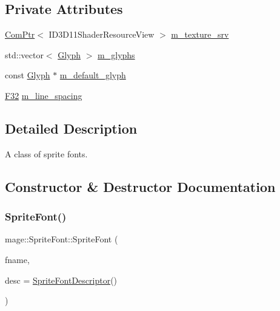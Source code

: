 \subsection*{Private Attributes}
\begin{DoxyCompactItemize}
\item 
\hyperlink{namespacemage_ae74f374780900893caa5555d1031fd79}{Com\+Ptr}$<$ I\+D3\+D11\+Shader\+Resource\+View $>$ \hyperlink{classmage_1_1_sprite_font_a0f52f8845cb204d4ca3b3f3020df0029}{m\+\_\+texture\+\_\+srv}
\item 
std\+::vector$<$ \hyperlink{structmage_1_1_glyph}{Glyph} $>$ \hyperlink{classmage_1_1_sprite_font_a8862df8d743ea33996c76e421724c0a7}{m\+\_\+glyphs}
\item 
const \hyperlink{structmage_1_1_glyph}{Glyph} $\ast$ \hyperlink{classmage_1_1_sprite_font_ad25667d3bfb539b71b39124fdc8ed6d6}{m\+\_\+default\+\_\+glyph}
\item 
\hyperlink{namespacemage_aa97e833b45f06d60a0a9c4fc22ae02c0}{F32} \hyperlink{classmage_1_1_sprite_font_a0d85446d7a3e2c1f73a013314fca4d84}{m\+\_\+line\+\_\+spacing}
\end{DoxyCompactItemize}


\subsection{Detailed Description}
A class of sprite fonts. 

\subsection{Constructor \& Destructor Documentation}
\hypertarget{classmage_1_1_sprite_font_a14069bfb14980107c74407182e591927}{}\label{classmage_1_1_sprite_font_a14069bfb14980107c74407182e591927} 
\subsubsection{\texorpdfstring{Sprite\+Font()}{SpriteFont()}\hspace{0.1cm}{\footnotesize\ttfamily [1/4]}}
{\footnotesize\ttfamily mage\+::\+Sprite\+Font\+::\+Sprite\+Font (\begin{DoxyParamCaption}\item[{wstring}]{fname,  }\item[{const \hyperlink{classmage_1_1_sprite_font_descriptor}{Sprite\+Font\+Descriptor} \&}]{desc = {\ttfamily \hyperlink{classmage_1_1_sprite_font_descriptor}{Sprite\+Font\+Descriptor}()} }\end{DoxyParamCaption})\hspace{0.3cm}{\ttfamily [explicit]}}

